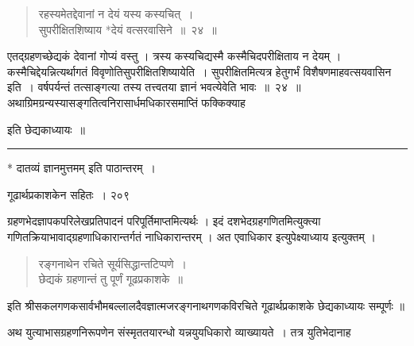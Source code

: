 \documentclass[11pt, openany]{book}
\begin{document}

\begin{quote}
{\ssi रहस्यमेतद्देवानां न देयं यस्य कस्यचित्~।\\
सुपरीक्षितशिष्याय *देयं वत्सरवासिने~॥~२४~॥ }
\end{quote}


 एतद्ग्रहणच्छेद्यकं देवानां गोप्यं वस्तु । त्रस्य कस्यचिद्यस्मै कस्मैचिदपरीक्षिताय न देयम् । कस्मैचिद्देयन्नित्यर्थागतं विवृणोति\textendash सुपरीक्षितशिष्यायेति~। सुपरीक्षितमित्यत्र हेतुगर्भं विशैषणमाह\textendash वत्सयवासिन इति~। वर्षपर्यन्तं तत्साङ्गत्या तस्य तत्त्वतया ज्ञानं भवत्येवेति भावः~॥~२४~॥\\
 \noindent अथाग्रिमग्रन्यस्यासङ्गतित्वनिरासार्धमधिकारसमाप्तिं फक्किक्याह \textendash 


\begin{center}
 इति छेद्यकाध्यायः~॥
\end{center}

\noindent \rule{\linewidth}{.5pt}

\begin{center}
 * दातव्यं ज्ञानमुत्तमम् इति पाठान्तरम्~।
\end{center}


\newpage


\hspace{3cm} गूढार्थप्रकाशकेन सहितः~। \hfill २०९
\vspace{1cm}


 ग्रहणभेदज्ञापकपरिलेखप्रतिपादनं परिपूर्तिमाप्तमित्यर्थः । इदं दशभेदग्रहगणितमित्युक्त्या गणितक्रियाभावाद्ग्रहणाधिकारान्तर्गतं नाधिकारान्तरम् । अत एवाधिकार इत्युपेक्ष्याध्याय इत्युक्तम् । 


 \begin{quote}
 {\ssi रङ्गनाथेन रचिते सूर्यसिद्धान्तटिप्पणे~।\\
 छेद्यकं ग्रहणान्तं तु पूर्णं गूढप्रकाशके~॥ }
 \end{quote}
\begin{center}
\noindent%
इति श्रीसकलगणकसार्वभौमबल्लालदैवज्ञात्मजरङ्गनाथगणकविरचिते गूढार्थप्रकाशके छेद्यकाध्यायः सम्पूर्णः ॥
\end{center}


\noindent अथ युत्याभासग्रहणनिरूपणेन संस्मृततयारन्धो यन्नयुयधिकारो व्याख्यायते~।  तत्र युतिभेदानाह\textendash
\end{document}
